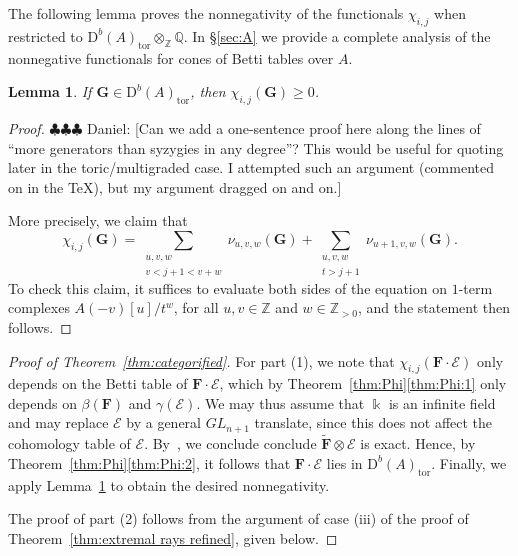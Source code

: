 \documentclass[12pt]{amsart}
\newtheorem{lemma}{Lemma}[section]
\theoremstyle{definition}
\theoremstyle{remark}
\newcommand{\kk}{\Bbbk}
\newcommand{\ZZ}{\mathbb{Z}}
\newcommand{\QQ}{\mathbb{Q}}
\newcommand{\cE}{\mathcal{E}}
\newcommand{\FF}{\mathbf{F}}
\newcommand{\Gbull}{\mathbf{G}}
\newcommand{\GL}{{GL}}
\newcommand{\DD}{\mathrm{D}}
\newcommand{\daniel}[1]{{\color{green} \sf $\clubsuit\clubsuit\clubsuit$ Daniel: [#1]}}
\begin{document}
The following lemma proves the nonnegativity of the functionals $\chi_{i,j}$ when restricted to $\DD^b(A)_{\text{tor}}\otimes_{\ZZ} \QQ$.  In \S\ref{sec:A} we provide a  complete analysis of the nonnegative functionals for cones of Betti tables over $A$.

\begin{lemma}\label{lem:chi nonneg}
If $\Gbull\in \DD^b(A)_{\text{tor}}$, then $\chi_{i,j}(\Gbull)\geq 0$.
\end{lemma}
\begin{proof}
\daniel{Can we add a one-sentence proof here along the lines of ``more generators than syzygies in any degree''?  This would be useful for quoting later in the toric/multigraded case.  I attempted such an argument (commented on in the TeX), but my argument dragged on and on.}
%

More precisely, we claim that
\[
\chi_{i,j}(\Gbull)=\sum_{\substack{u,v,w \\ v< j+1<v+w}} \nu_{u,v,w}(\Gbull) + \sum_{\substack{u,v,w\\ t> j+1}} \nu_{u+1,v,w}(\Gbull).
\]
To check this claim, it suffices to evaluate both sides of the equation on $1$-term complexes $A(-v)[u]/t^w$, for all $u,v\in \ZZ$ and $w\in \ZZ_{>0}$, and the statement then follows.
\end{proof}

\begin{proof}[Proof of Theorem~\ref{thm:categorified}]
For part (1), we note that $\chi_{i,j}(\FF\cdot \cE)$ only depends on the Betti table of $\FF\cdot \cE$, which by Theorem~\ref{thm:Phi}\eqref{thm:Phi:1} only depends on $\beta(\FF)$ and $\gamma(\cE)$.  We may thus assume that $\kk$ is an infinite field and may replace $\cE$ by a general $\GL_{n+1}$ translate, since this does not affect the cohomology table of $\cE$.  By~\cite[Theorem]{miller-speyer}, we conclude conclude $\widetilde{\FF}\otimes \cE$ is exact.  Hence, by Theorem~\ref{thm:Phi}\eqref{thm:Phi:2}, it follows that $\FF\cdot \cE$ lies in $\DD^b(A)_{\text{tor}}$.  Finally, we apply Lemma~\ref{lem:chi nonneg} to obtain the desired nonnegativity.


The proof of part (2) follows from the argument of case (iii) of the proof of Theorem~\ref{thm:extremal rays refined}, given below.  
\end{proof}
\end{document}
